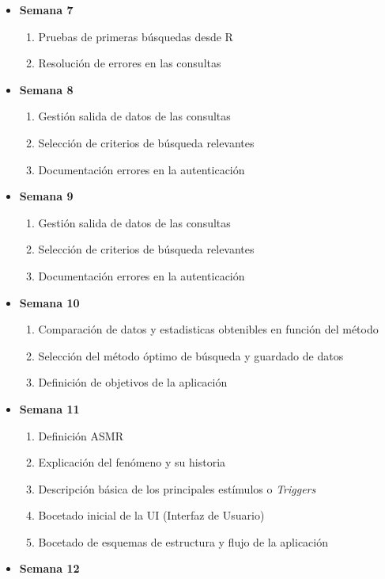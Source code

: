 \documentclass[a4paper,12pt,twoside]{memoir}
\begin{document}
\begin{itemize}
    \item \textbf{Semana 7}
    \begin{enumerate}
        \item Pruebas de primeras búsquedas desde R
        \item Resolución de errores en las consultas
    \end{enumerate}
    \item \textbf{Semana 8}
    \begin{enumerate}
        \item Gestión salida de datos de las consultas
        \item Selección de criterios de búsqueda relevantes
        \item Documentación errores en la autenticación
    \end{enumerate}
    \item \textbf{Semana 9}
    \begin{enumerate}
        \item Gestión salida de datos de las consultas
        \item Selección de criterios de búsqueda relevantes
        \item Documentación errores en la autenticación
    \end{enumerate}
    \item \textbf{Semana 10}
    \begin{enumerate}
        \item Comparación de datos y estadisticas obtenibles en función del método
        \item Selección del método óptimo de búsqueda y guardado de datos
        \item Definición de objetivos de la aplicación
    \end{enumerate}
    \item \textbf{Semana 11}
    \begin{enumerate}
        \item Definición ASMR
        \item Explicación del fenómeno y su historia
        \item Descripción básica de los principales estímulos o \textit{Triggers}
        \item Bocetado inicial de la UI (Interfaz de Usuario)
        \item Bocetado de esquemas de estructura y flujo de la aplicación
        \end{enumerate}
    \item \textbf{Semana 12}

\end{itemize}
\end{document}
